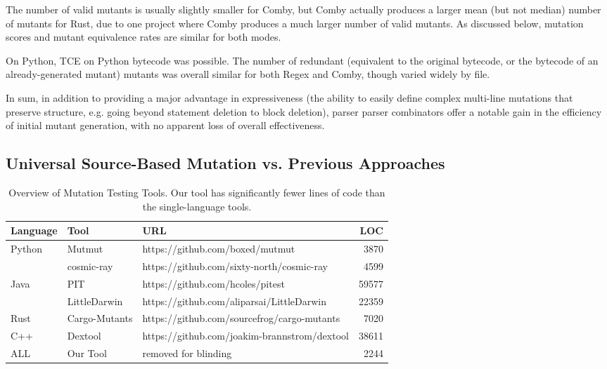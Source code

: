 \documentclass[sigconf,review, anonymous]{acmart}
\begin{document}
{The number of valid mutants is usually
slightly smaller for Comby, but Comby actually produces a larger mean
(but not median) number of mutants for Rust, due to one project where
Comby produces a much larger number of valid mutants.  As discussed 
below, mutation scores and mutant equivalence rates are similar for
both modes.

On Python, TCE on Python bytecode was possible. The
number of redundant (equivalent to the original bytecode, or
the bytecode of an already-generated mutant) mutants was
overall similar for both Regex and Comby, though varied widely by file.

In sum, in addition to providing a major advantage in expressiveness
(the ability to easily define complex multi-line mutations that
preserve structure, e.g. going beyond statement deletion to block
deletion), parser parser combinators offer a notable gain in the
efficiency of initial mutant generation, with no apparent loss of overall effectiveness.

\subsection{Universal Source-Based Mutation vs. Previous Approaches}

\begin{table*}[hbtp]
{\small
    \centering
    \caption{\small Overview of Mutation Testing Tools. Our tool has significantly fewer lines of code than the single-language tools.}
    \label{tab:mutationtools}
    
    \begin{tabular}{|l|l|l|r|}
    \hline
    \textbf{Language} & \textbf{Tool} & \textbf{URL} & \textbf{LOC}  \\
    \hline
    \multirow{2}{*}{Python}  & Mutmut & https://github.com/boxed/mutmut & 3870  \\\cline{2-4}
        & cosmic-ray & https://github.com/sixty-north/cosmic-ray & 4599 \\ \hline
    \multirow{2}{*}{Java}  & PIT & https://github.com/hcoles/pitest & 59577  \\\cline{2-4}
        & LittleDarwin & https://github.com/aliparsai/LittleDarwin & 22359 \\ \hline
        Rust & Cargo-Mutants & https://github.com/sourcefrog/cargo-mutants & 7020 \\\hline
        C++ & Dextool & https://github.com/joakim-brannstrom/dextool & 38611 \\\hline
        ALL & Our Tool & removed for blinding & 2244 \\\hline
    \end{tabular}}
    \end{table*}
    
}
\end{document}
